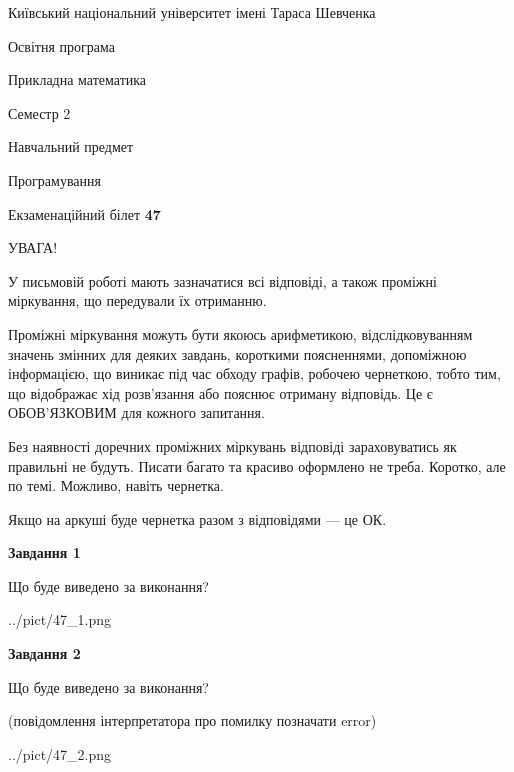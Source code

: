 \documentclass[12pt, ukrainian]{article}
\begin{document}
{{\begin {small}\par
{ \center  Київський національний університет імені Тараса Шевченка \par}
{\parbox {5 cm}{Освітня програма \hfill}{\parbox {7 cm}{Прикладна математика\hfill}}\parbox {6 cm}{\hfill Семестр 2}}\par
{\parbox {5 cm} {Навчальний предмет \hfill}\parbox {7 cm}{Програмування \hfill}\parbox {6cm}{\hfill}\par}\vspace{-7pt} \end{small}}{\center Екзаменаційний білет \No \textbf
{ 47 }\par}}
{
\begin {large}
УВАГА!

У письмовій роботі мають зазначатися всі відповіді, а також проміжні міркування, що передували їх отриманню.

Проміжні міркування можуть бути якоюсь арифметикою, відслідковуванням зна\-чень змінних для деяких завдань,
короткими поясненнями, допоміжною інформацією, що виникає під час обходу графів, робочею чернеткою,
тобто тим, що відображає хід розв’язання або пояснює отриману відповідь.
Це є ОБОВ’ЯЗКОВИМ для кожного запитання.

Без наявності доречних проміжних міркувань відповіді зараховуватись як правиль\-ні не будуть.
Писати багато та красиво оформлено не треба. Коротко, але по темі. Можли\-во, навіть чернетка.

Якщо на аркуші буде чернетка разом з відповідями --- це ОК.

\newpage

{\begin {center}\textbf{Завдання 1}\end {center}}\par
Що буде виведено за виконання?\par
\begin{center}
	{../pict/47_1.png}
\end{center}
\newpage

{\begin {center}\textbf{Завдання 2}\end {center}}\par
Що буде виведено за виконання?\par
 (повідомлення інтерпретатора про помилку позначати error)\par
\begin{center}
	{../pict/47_2.png}
\end{center}
\newpage


\end{large}}
\end{document}
